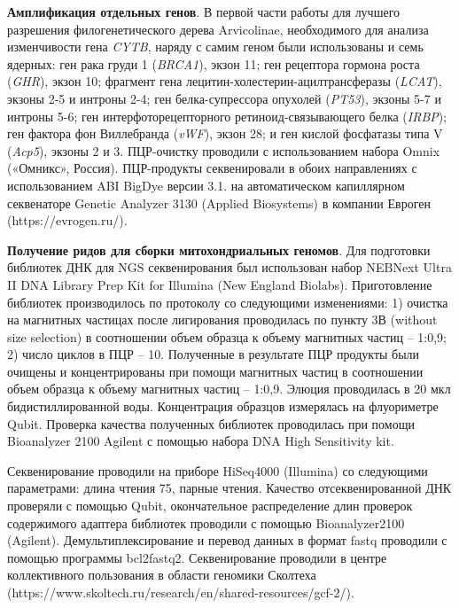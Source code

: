 \textbf{Амплификация отдельных генов}. В первой части работы для лучшего разрешения филогенетического дерева Arvicolinae, необходимого для анализа изменчивости гена \textit{CYTB}, наряду с самим геном были использованы и семь ядерных: ген рака груди 1 (\textit{BRCA1}), экзон 11; ген рецептора гормона роста (\textit{GHR}), экзон 10; фрагмент гена лецитин-холестерин-ацилтрансферазы (\textit{LCAT}), экзоны 2-5 и интроны 2-4; ген белка-супрессора опухолей (\textit{PT53}), экзоны 5-7 и интроны 5-6; ген интерфоторецепторного ретиноид-связывающего белка (\textit{IRBP}); ген фактора фон Виллебранда (\textit{vWF}), экзон 28; и ген кислой фосфатазы типа V (\textit{Acp5}), экзоны 2 и 3. ПЦР-очистку проводили с использованием набора Omnix («Омникс», Россия). ПЦР-продукты секвенировали в обоих направлениях с использованием ABI BigDye версии 3.1. на автоматическом капиллярном секвенаторе Genetic Analyzer 3130 (Applied Biosystems) в компании Евроген (https://evrogen.ru/). 

\textbf{Получение ридов для сборки митохондриальных геномов}. Для подготовки библиотек ДНК для NGS секвенирования был использован набор NEBNext Ultra II DNA Library Prep Kit for Illumina (New England Biolabs). Приготовление библиотек производилось по протоколу со следующими изменениями: 1)  очистка на магнитных частицах после лигирования проводилась по пункту 3В (without size selection) в соотношении объем образца к объему магнитных частиц -- 1:0,9; 2) число циклов в ПЦР -- 10.
Полученные в результате ПЦР продукты были очищены и концентрированы при помощи магнитных частиц в соотношении объем образца к объему магнитных частиц -- 1:0,9. Элюция проводилась в 20 мкл бидистиллированной воды. Концентрация образцов измерялась на флуориметре Qubit.
Проверка качества полученных библиотек проводилась при помощи Bioanalyzer 2100 Agilent с помощью набора DNA High Sensitivity kit.

Секвенирование проводили на приборе HiSeq4000 (Illumina) со следующими параметрами: длина чтения 75, парные чтения. Качество отсеквенированной ДНК проверяли с помощью Qubit, окончательное распределение длин проверок содержимого адаптера библиотек проводили с помощью Bioanalyzer2100 (Agilent). Демультиплексирование и перевод данных в формат fastq проводили с помощью программы bcl2fastq2. Секвенирование проводили в центре коллективного пользования в области геномики Сколтеха (https://www.skoltech.ru/research/en/shared-resources/gcf-2/).

